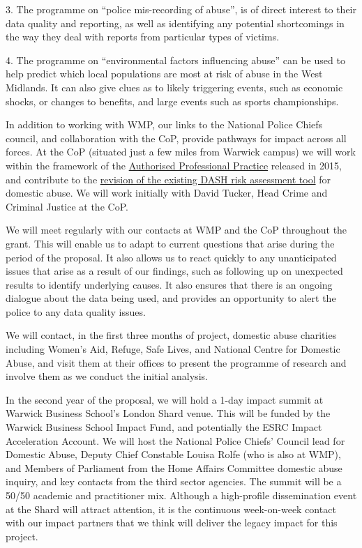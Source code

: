 \documentclass[11pt, a4paper]{article}
\begin{document}
3. The programme on ``police mis-recording of abuse'', is of direct interest to their data quality and reporting, as well as identifying any potential shortcomings in the way they deal with reports from particular types of victims. 

4. The programme on ``environmental factors influencing abuse'' can be used to help predict which local populations are most at risk of abuse in the West Midlands. It can also give clues as to likely triggering events, such as economic shocks, or changes to benefits, and large events such as sports championships.

In addition to working with WMP, our links to the National Police Chiefs council, and collaboration with the CoP, provide pathways for impact across all forces. At the CoP (situated just a few miles from Warwick campus) we will work within the framework of the \href{https://www.app.college.police.uk/app-content/major-investigation-and-public-protection/domestic-abuse/introduction/)}{Authorised Professional Practice} released in 2015, and contribute to the \href{https://whatworks.college.police.uk/Research/Documents/DA_risk_assessment_pilot.pdf}{revision of the existing DASH risk assessment tool} for domestic abuse. We will work initially with David Tucker, Head Crime and Criminal Justice at the CoP.

We will meet regularly with our contacts at WMP and the CoP throughout the grant. This will enable us to adapt to current questions that arise during the period of the proposal. It also allows us to react quickly to any unanticipated issues that arise as a result of our findings, such as following up on unexpected results to identify underlying causes. It also ensures that there is an ongoing dialogue about the data being used, and provides an opportunity to alert the police to any data quality issues.

We will contact, in the first three months of project, domestic abuse charities including Women's Aid, Refuge, Safe Lives, and National Centre for Domestic Abuse, and visit them at their offices to present the programme of research and involve them as we conduct the initial analysis.

In the second year of the proposal, we will hold a 1-day impact summit at Warwick Business School's London Shard venue. This will be funded by the Warwick Business School Impact Fund, and potentially the ESRC Impact Acceleration Account. We will host the National Police Chiefs' Council lead for Domestic Abuse, Deputy Chief Constable Louisa Rolfe (who is also at WMP), and Members of Parliament from the Home Affairs Committee domestic abuse inquiry, and key contacts from the third sector agencies. The summit will be a 50/50 academic and practitioner mix. Although a high-profile dissemination event at the Shard will attract attention, it is the continuous week-on-week contact with our impact partners that we think will deliver the legacy impact for this project.
\end{document}
